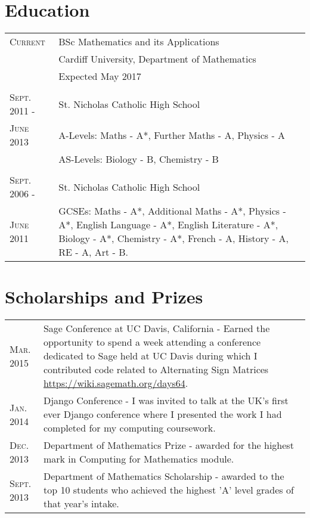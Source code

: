 \documentclass[a4paper]{article}
\begin{document}
\section{Education}
\begin{tabularx}{\textwidth}{lX}

\textsc{Current} & \textsc BSc Mathematics and its Applications \\
&\normalsize Cardiff University, Department of Mathematics\\
& Expected May 2017\\
\\
\textsc{Sept. 2011 -} & St. Nicholas Catholic High School\\
\textsc{June 2013} & A-Levels: Maths - A*, Further Maths - A, Physics - A\\
& AS-Levels: Biology - B, Chemistry - B\\
\\
\textsc{Sept. 2006 -} & St. Nicholas Catholic High School\\
\textsc{June 2011} & GCSEs: Maths - A*, Additional Maths - A*, Physics - A*, English Language - A*, English Literature - A*, Biology - A*, Chemistry - A*, French - A, History - A, RE - A, Art - B.\\

\end{tabularx}
\section{Scholarships and Prizes}
\begin{tabularx}{\textwidth}{lX}

\textsc{Mar.} 2015 & Sage Conference at UC Davis, California - Earned the opportunity to spend a week attending a conference dedicated to Sage held at UC Davis during which I contributed code related to Alternating Sign Matrices \url{https://wiki.sagemath.org/days64}.\\
\textsc{Jan.} 2014 & Django Conference - I was invited to talk at the UK's first ever Django conference where I presented the work I had completed for my computing coursework.\\
\textsc{Dec.} 2013 & Department of Mathematics Prize - awarded for the highest mark in Computing for Mathematics module.\\
\textsc{Sept.} 2013 & Department of Mathematics Scholarship - awarded to the top 10 students who achieved the highest 'A' level grades of that year's intake.\\

\end{tabularx}
\end{document}
